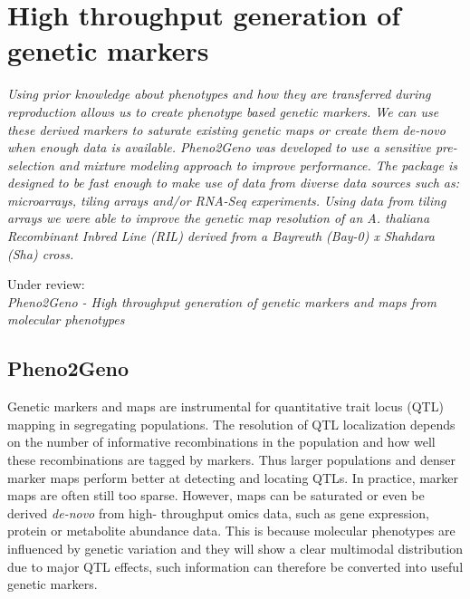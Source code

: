 \chapter{High throughput generation of genetic markers}
\thispagestyle{empty}
\label{chap:pheno2geno}
\emph{Using prior knowledge about phenotypes and how they are transferred during 
reproduction allows us to create phenotype based genetic markers. We can use 
these derived markers to saturate existing genetic maps or create them de-novo 
when enough data is available. Pheno2Geno was developed to use a sensitive 
pre-selection and mixture modeling approach to improve performance. The package 
is designed to be fast enough to make use of data from diverse data sources such 
as: microarrays, tiling arrays and/or RNA-Seq experiments. Using data from tiling 
arrays we were able to improve the genetic map resolution of an A. thaliana 
Recombinant Inbred Line (RIL) derived from a Bayreuth (Bay-0) x Shahdara (Sha) cross.}

\null
\vfill

\begin{myexampleblock}{Under review:}
  \\
  \emph{Pheno2Geno - High throughput generation of genetic markers and maps from molecular phenotypes}\\
\end{myexampleblock}
\newpage

\section{Pheno2Geno}
Genetic markers and maps are instrumental for quantitative trait locus (QTL) mapping in segregating 
populations. The resolution of QTL localization depends on the number of informative recombinations 
in the population and how well these recombinations are tagged by markers. Thus larger populations 
and denser marker maps perform better at detecting and locating QTLs. In practice, marker maps are 
often still too sparse. However, maps can be saturated or even be derived \emph{de-novo} from high-
throughput omics data, such as gene expression, protein or metabolite abundance data. This is because 
molecular phenotypes are influenced by genetic variation and they will show a clear multimodal 
distribution due to major QTL effects, such information can therefore be converted into useful 
genetic markers.

